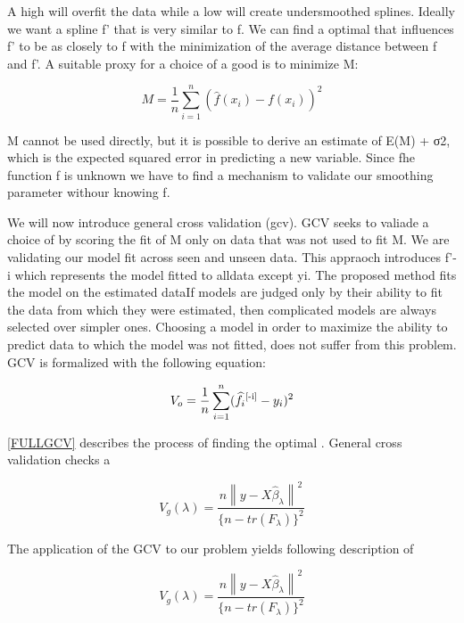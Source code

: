 \documentclass{article}
\begin{document}
    A high \textlambda will overfit the data while a low \textlambda will create undersmoothed splines. Ideally we want a spline f' that is very similar to f. We can find a optimal \textlambda that influences f' to be as closely to f with the minimization of the average distance between f and f'. A suitable proxy for a choice of a good \textlambda is to minimize M:

    \begin{equation} \label{GCV} M = \frac{1}{n} \sum_{i=1}^{n} (\widehat{f}(x_i) - f(x_i))^2 \end{equation}

    M cannot be used directly, but it is possible to derive an estimate of E(M) + σ2, which is the expected squared error in predicting a new variable. Since fhe function f is unknown we have to find a mechanism to validate our smoothing parameter withour knowing f.

    We will now introduce general cross validation (gcv). GCV seeks to valiade a choice of \textlambda by scoring the fit of M only on data that was not used to fit M. We are validating our model fit across seen and unseen data. This appraoch introduces f'-i which represents the model fitted to alldata except yi. The proposed method fits the model on the estimated dataIf models are judged only by their ability to fit the data from which they were estimated, then complicated models are always selected over simpler ones. Choosing a model in order to maximize the ability to predict data to which the model was not fitted, does not suffer from this problem. GCV is formalized with the following equation:

    \begin{equation} \label{FULLGCV} V_o = \frac{1}{n} \sum_{i=1}^{n} (\widehat{f}_i\textsuperscript{[-i]}-y_i)^2 \end{equation}

    \ref{FULLGCV} describes the process of finding the optimal \textlambda. General cross validation checks a \textlambda

    \begin{equation} V_g(\lambda) = \frac{n\left \| y-X\widehat{\beta}_\lambda \right \| ^2}{\{n-tr(F_\lambda) \}^2} \end{equation}

    The application of the GCV to our problem yields following description of \textlambda

    \begin{equation} \label{GCV2} V_g(\lambda) = \frac{n\left \| y-X\widehat{\beta}_\lambda \right \| ^2}{\{n-tr(F_\lambda) \}^2} \end{equation}
\end{document}
